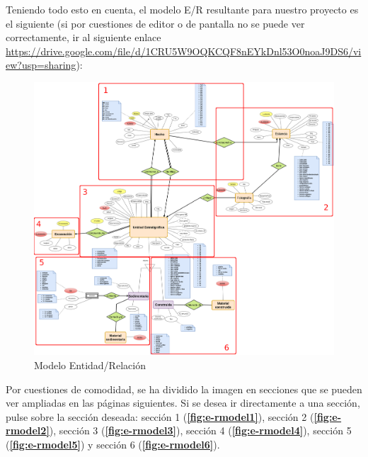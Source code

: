     Teniendo todo esto en cuenta, el modelo E/R resultante para nuestro proyecto es el
    siguiente (si por cuestiones de editor o de pantalla no se puede ver correctamente,
    ir al siguiente enlace 
    \url{https://drive.google.com/file/d/1CRU5W9OQKCQF8nEYkDnl53O0noaJ9DS6/view?usp=sharing}):

        \begin{figure}[H]
            \centering
            \includegraphics[scale=0.15]{imagenes/E-RModel.png}
            \caption{Modelo Entidad/Relación}
            \label{fig:e-rmodel}
        \end{figure}

    Por cuestiones de comodidad, se ha dividido la imagen en secciones que se pueden ver
    ampliadas en las páginas siguientes. Si se desea ir directamente a una sección, pulse
    sobre la sección deseada: sección 1 (\textbf{\ref{fig:e-rmodel1}}), sección 2
    (\textbf{\ref{fig:e-rmodel2}}), sección 3 (\textbf{\ref{fig:e-rmodel3}}), sección 4
    (\textbf{\ref{fig:e-rmodel4}}), sección 5 (\textbf{\ref{fig:e-rmodel5}}) y sección 6
    (\textbf{\ref{fig:e-rmodel6}}).


